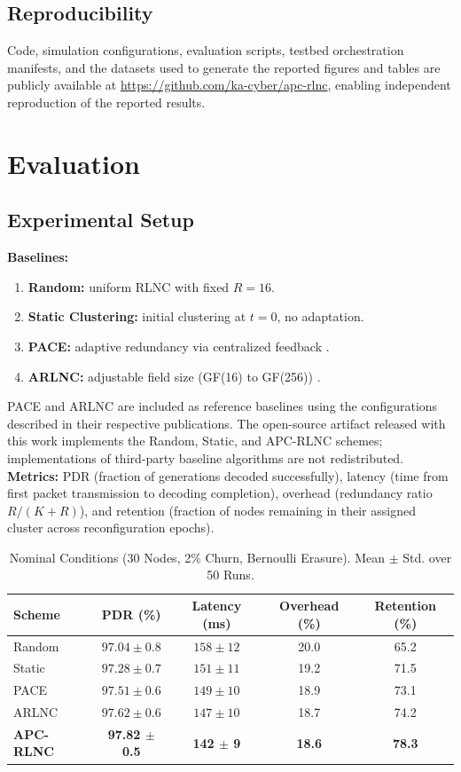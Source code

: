 \documentclass[journal]{IEEEtran}
\begin{document}
\subsection{Reproducibility}
Code, simulation configurations, evaluation scripts,
testbed orchestration manifests, and the datasets used
to generate the reported figures and tables are publicly
available at \url{https://github.com/ka-cyber/apc-rlnc},
enabling independent reproduction of the reported results.

\section{Evaluation}
\label{sec:evaluation}

\subsection{Experimental Setup}
\textbf{Baselines:}
\begin{enumerate}
\item \textbf{Random:} uniform RLNC with fixed $R=16$.
\item \textbf{Static Clustering:} initial clustering at $t=0$, no adaptation.
\item \textbf{PACE:} adaptive redundancy via centralized feedback \cite{pandi2017}.
\item \textbf{ARLNC:} adjustable field size (GF(16) to GF(256)) \cite{dilanchian2024}.
\end{enumerate}
PACE and ARLNC are included as reference baselines using the
configurations described in their respective publications. The
open-source artifact released with this work implements the Random,
Static, and APC-RLNC schemes; implementations of third-party baseline
algorithms are not redistributed.
\textbf{Metrics:} PDR (fraction of generations decoded successfully), latency (time from first packet transmission to decoding completion), overhead (redundancy ratio $R/(K+R)$), and retention (fraction of nodes remaining in their assigned cluster across reconfiguration epochs).

\begin{table}[!t]
\caption{Nominal Conditions (30 Nodes, 2\% Churn, Bernoulli Erasure). Mean $\pm$ Std. over 50 Runs.}
\label{tab:nominal}
\centering
\footnotesize
\begin{tabular}{lcccc}
\hline
Scheme & PDR (\%) & Latency (ms) & Overhead (\%) & Retention (\%) \\
\hline
Random    & $97.04 \pm 0.8$ & $158 \pm 12$ & 20.0 & 65.2 \\
Static    & $97.28 \pm 0.7$ & $151 \pm 11$ & 19.2 & 71.5 \\
PACE      & $97.51 \pm 0.6$ & $149 \pm 10$ & 18.9 & 73.1 \\
ARLNC     & $97.62 \pm 0.6$ & $147 \pm 10$ & 18.7 & 74.2 \\
\textbf{APC-RLNC} & \textbf{97.82 $\pm$ 0.5} & \textbf{142 $\pm$ 9} & \textbf{18.6} & \textbf{78.3} \\
\hline
\end{tabular}
\end{table}
\end{document}
